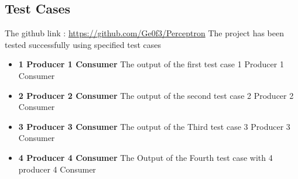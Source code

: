 \documentclass{article}
\begin{document}
\subsection{Test Cases}
The github link :  \url{https://github.com/Ge0f3/Perceptron}
The project has been tested successfully using specified test cases
\begin{itemize}
\item \textbf{1 Producer 1 Consumer} The output of the first test case 1 Producer 1 Consumer \\  \url{}
\item \textbf{2 Producer 2 Consumer } The output of the second test case 2 Producer 2 Consumer \\  \url{}
\item \textbf{3 Producer 3 Consumer } The output of the Third test case 3 Producer 3 Consumer \\  \url{}
\item \textbf{4 Producer 4 Consumer } The Output of the Fourth test case with 4 producer 4 Consumer \\  \url{}
\end{itemize}
\end{document}
